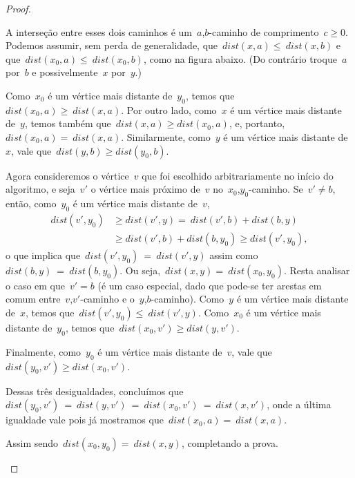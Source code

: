 \documentclass[a4paper,12pt]{article}
\begin{document}
\begin{proof}
\begin{itemize}
			A interseção entre esses dois caminhos é 
			um~$a$,$b$-caminho de comprimento~$c \ge 0$.
			Podemos assumir, sem perda de generalidade, 
			que~$dist(x,a) \le~dist(x,b)$ e 
			que~$dist(x_0,a) \le~dist(x_0,b)$, como na figura abaixo.
			(Do contrário troque~$a$ por~$b$ e possivelmente~$x$
			por~$y$.)

			\begin{center}  \end{center}


			Como~$x_0$ é um vértice mais distante de~$y_0$,
			temos que~$dist(x_0,a)\ge~dist(x,a)$.
			Por outro lado, como~$x$ é um vértice mais distante
			de~$y$, temos também que~$dist(x,a)\ge dist(x_0,a)$,
			e, portanto,~$dist(x_0,a) =~dist(x,a)$.
			Similarmente, como~$y$ é um vértice mais distante de~$x$, 
			vale que~$dist(y,b) \ge dist(y_0,b)$.

			Agora consideremos o vértice~$v$ que foi escolhido 
			arbitrariamente no início do algoritmo, e seja~$v'$
			o vértice mais próximo de~$v$ no~$x_0$,$y_0$-caminho.
			Se~$v'\ne b$, então, como~$y_0$ é um vértice mais 
			distante de~$v$,
			\begin{align}
				dist(v',y_0) &\ge dist(v',y) =~dist(v',b) + dist(b,y)\nonumber \\
				&\ge dist(v',b) + dist(b,y_0) \ge dist(v',y_0) \nonumber,
			\end{align} 
			o que implica que~$dist(v',y_0)~=~dist(v',y)$ assim
			como~$ dist(b,y)~=~dist(b,y_0)$. 
			Ou seja,~$dist(x,y) =~dist(x_0,y_0)$.
			Resta analisar o caso em que~$v'=b$ (é um caso especial,
			dado que pode-se ter arestas em comum entre~$v$,$v'$-caminho 
			e o~$y$,$b$-caminho).
			Como~$y$ é um vértice mais distante de~$x$, temos 
			que~$dist(v',y_0) \le~dist(v',y)$.
			Como~$x_0$ é um vértice mais distante de~$y_0$, temos
			que~$dist(x_0,v') \ge dist(y,v')$.
			
			Finalmente, como~$y_0$ é um vértice mais distante 
			de~$v$, vale que~$dist(y_0,v')\ge dist(x_0,v')$.

			Dessas três desigualdades, concluímos 
			que~$dist(y_0,v')~=~dist(y,v')~=~dist(x_0,v')~=~dist(x,v')$,
			onde a última igualdade vale pois já mostramos 
			que~$dist(x_0,a) =~dist(x,a)$.

			Assim sendo~$dist(x_0,y_0) =~dist(x,y)$, completando a prova.

		\end{itemize}
	\end{proof}
\end{document}
